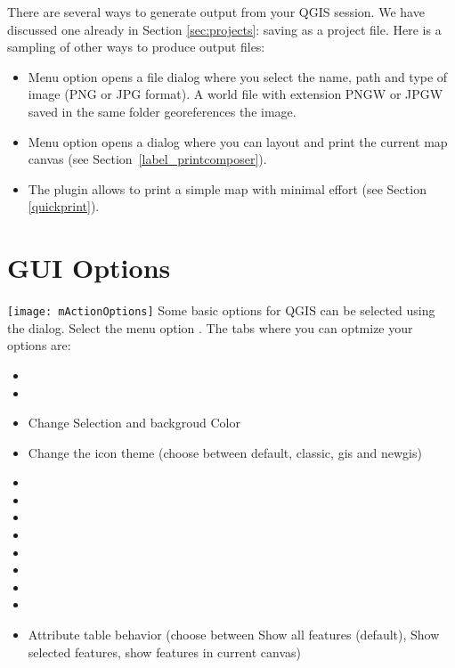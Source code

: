 There are several ways to generate output from your QGIS session. We have
discussed one already in Section \ref{sec:projects}: saving as a project file.
Here is a sampling of other ways to produce output files:

\begin{itemize}
\item Menu option  opens
a file dialog where you select the name, path and type of image (PNG or JPG
format). A world file with extension PNGW or JPGW saved in the same folder
georeferences the image.
\item Menu option  opens a
dialog where you can layout and print the current map canvas (see
Section~\ref{label_printcomposer}).
\item The  plugin allows
to print a simple map with minimal effort (see Section \ref{quickprint}).
\end{itemize}

\section{GUI Options}\label{subsec:gui_options}

\texttt{[image: mActionOptions]} Some basic options
for QGIS can be selected using the  dialog. Select the
menu option  \arrow
{}. The tabs where you can
optmize your options are:


\begin{itemize}
\item {}
\item {}
\item Change Selection and backgroud Color
\item Change the icon theme (choose between default, classic, gis and newgis)
\item {}
\item {}
\item {}
\item {}
\item {}
\item {}
\item {}
\item {}
\item Attribute table behavior (choose between Show all features (default), Show selected features,
show features in current canvas)
\end{itemize}

